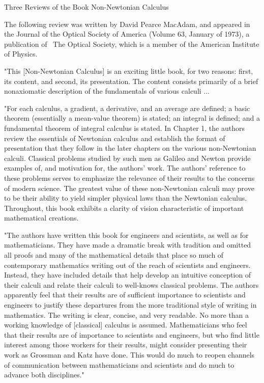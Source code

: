 \documentclass[12pt]{article}
\begin{document}
Three Reviews of the Book Non-Newtonian Calculus

The following review was written by David Pearce MacAdam, and appeared in the Journal of the Optical Society of America (Volume 63, January of 1973), a publication of  The Optical Society, which is a member of the American Institute of Physics.

"This [Non-Newtonian Calculus] is an exciting little book, for two reasons: first, its content, and second, its presentation. The content consists primarily of a brief nonaxiomatic description of the fundamentals of various calculi ...

"For each calculus, a gradient, a derivative, and an average are defined; a basic theorem (essentially a mean-value theorem) is stated; an integral is defined; and a fundamental theorem of integral calculus is stated. In Chapter 1, the authors review the essentials of Newtonian calculus and establish the format of presentation that they follow in the later chapters on the various non-Newtonian calculi. Classical problems studied by such men as Galileo and Newton provide examples of, and motivation for, the authors' work. The authors' reference to these problems serves to emphasize the relevance of their results to the concerns of modern science. The greatest value of these non-Newtonian calculi may prove to be their ability to yield simpler physical laws than the Newtonian calculus. Throughout, this book exhibits a clarity of vision characteristic of important mathematical creations.

"The authors have written this book for engineers and scientists, as well as for mathematicians. They have made a dramatic break with tradition and omitted all proofs and many of the mathematical details that place so much of contemporary mathematics writing out of the reach of scientists and engineers. Instead, they have included details that help develop an intuitive conception of their calculi and relate their calculi to well-knows classical problems. The authors apparently feel that their results are of sufficient importance to scientists and engineers to justify these departures from the more traditional style of writing in mathematics. The writing is clear, concise, and very readable. No more than a working knowledge of [classical] calculus is assumed. Mathematicians who feel that their results are of importance to scientists and engineers, but who find little interest among those workers for their results, might consider presenting their work as Grossman and Katz have done. This would do much to reopen channels of communication between mathematicians and scientists and do much to advance both disciplines."
\end{document}
